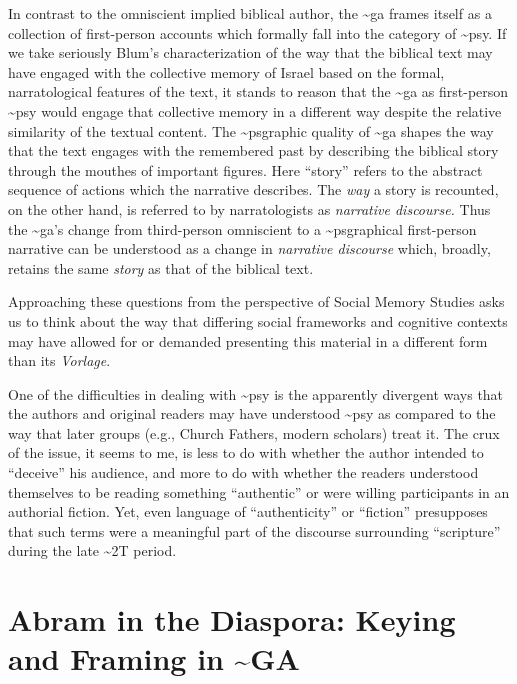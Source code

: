 In contrast to the omniscient implied biblical author, the
\textasciitilde{}ga frames itself as a collection of first-person
accounts which formally fall into the category of \textasciitilde{}psy.
If we take seriously Blum's characterization of the way that the
biblical text may have engaged with the collective memory of Israel
based on the formal, narratological features of the text, it stands to
reason that the \textasciitilde{}ga as first-person \textasciitilde{}psy
would engage that collective memory in a different way despite the
relative similarity of the textual content. The
\textasciitilde{}psgraphic quality of \textasciitilde{}ga shapes the way
that the text engages with the remembered past by describing the
biblical story through the mouthes of important figures. Here ``story''
refers to the abstract sequence of actions which the narrative
describes. The \emph{way} a story is recounted, on the other hand, is
referred to by narratologists as \emph{narrative discourse.} Thus the
\textasciitilde{}ga's change from third-person omniscient to a
\textasciitilde{}psgraphical first-person narrative can be understood as
a change in \emph{narrative discourse} which, broadly, retains the same
\emph{story} as that of the biblical text.

Approaching these questions from the perspective of Social Memory
Studies asks us to think about the way that differing social frameworks
and cognitive contexts may have allowed for or demanded presenting this
material in a different form than its \emph{Vorlage}.

One of the difficulties in dealing with \textasciitilde{}psy is the
apparently divergent ways that the authors and original readers may have
understood \textasciitilde{}psy as compared to the way that later groups
(e.g., Church Fathers, modern scholars) treat it. The crux of the issue,
it seems to me, is less to do with whether the author intended to
``deceive'' his audience, and more to do with whether the readers
understood themselves to be reading something ``authentic'' or were
willing participants in an authorial fiction. Yet, even language of
``authenticity'' or ``fiction'' presupposes that such terms were a
meaningful part of the discourse surrounding ``scripture'' during the
late \textasciitilde{}2T period.

\hypertarget{abram-in-the-diaspora-keying-and-framing-in-ga}{%
\section{Abram in the Diaspora: Keying and Framing in
\textasciitilde{}GA}\label{abram-in-the-diaspora-keying-and-framing-in-ga}}

